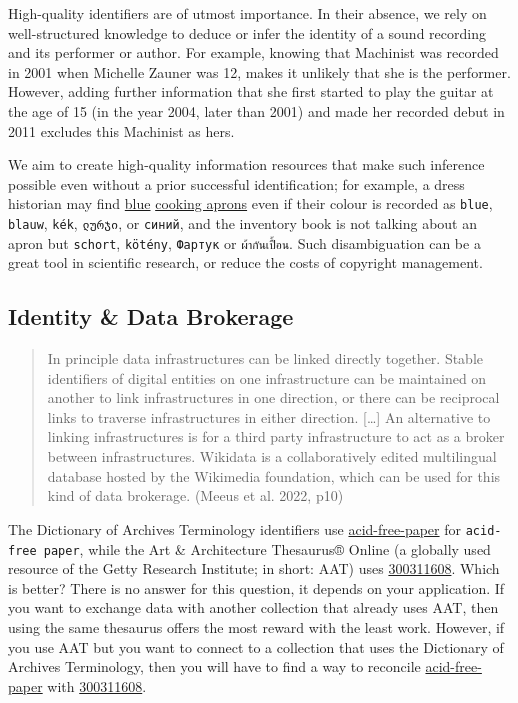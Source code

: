 \documentclass[
  letterpaper,
  DIV=11,
  numbers=noendperiod]{scrreprt}
\begin{document}
High-quality identifiers are of utmost importance. In their absence, we
rely on well-structured knowledge to deduce or infer the identity of a
sound recording and its performer or author. For example, knowing that
Machinist was recorded in 2001 when Michelle Zauner was 12, makes it
unlikely that she is the performer. However, adding further information
that she first started to play the guitar at the age of 15 (in the year
2004, later than 2001) and made her recorded debut in 2011 excludes this
Machinist as hers.

We aim to create high-quality information resources that make such
inference possible even without a prior successful identification; for
example, a dress historian may find
\href{http://vocab.getty.edu/page/aat/300129361}{blue}
\href{http://vocab.getty.edu/page/aat/300422315}{cooking aprons} even if
their colour is recorded as \texttt{blue}, \texttt{blauw}, \texttt{kék},
\texttt{ლურჯი}, or \texttt{синий}, and the inventory book is not talking
about an apron but \texttt{schort}, \texttt{kötény}, \texttt{Фартук} or
\texttt{ผ้ากันเปื้อน}. Such disambiguation can be a great tool in scientific
research, or reduce the costs of copyright management.

\subsection{Identity \& Data Brokerage}\label{identity-data-brokerage}

\begin{quote}
In principle data infrastructures can be linked directly together.
Stable identifiers of digital entities on one infrastructure can be
maintained on another to link infrastructures in one direction, or there
can be reciprocal links to traverse infrastructures in either direction.
{[}\ldots{]} An alternative to linking infrastructures is for a third
party infrastructure to act as a broker between infrastructures.
Wikidata is a collaboratively edited multilingual database hosted by the
Wikimedia foundation, which can be used for this kind of data brokerage.
(Meeus et al. 2022, p10)
\end{quote}

The Dictionary of Archives Terminology identifiers use
\href{https://dictionary.archivists.org/entry/acid-free-paper.html}{acid-free-paper}
for \texttt{acid-free\ paper}, while the Art \& Architecture Thesaurus®
Online (a globally used resource of the Getty Research Institute; in
short: AAT) uses
\href{http://vocab.getty.edu/page/aat/300311608}{300311608}. Which is
better? There is no answer for this question, it depends on your
application. If you want to exchange data with another collection that
already uses AAT, then using the same thesaurus offers the most reward
with the least work. However, if you use AAT but you want to connect to
a collection that uses the Dictionary of Archives Terminology, then you
will have to find a way to reconcile
\href{https://dictionary.archivists.org/entry/acid-free-paper.html}{acid-free-paper}
with \href{http://vocab.getty.edu/page/aat/300311608}{300311608}.
\end{document}
